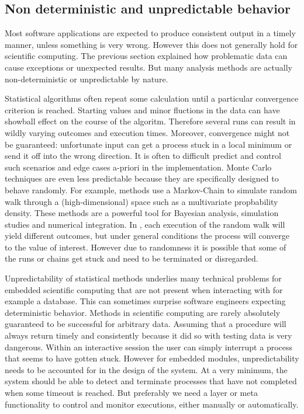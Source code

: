 \subsection{Non deterministic and unpredictable behavior}

Most software applications are expected to produce consistent output in a timely manner, unless something is very wrong. However this does not generally hold for scientific computing. The previous section explained how problematic data can cause exceptions or unexpected results. But many analysis methods are actually non-deterministic or unpredictable by nature.

Statistical algorithms often repeat some calculation until a particular convergence criterion is reached. Starting values and minor fluctions in the data can have showball effect on the course of the algoritm. Therefore several runs can result in wildly varying outcomes and execution times. Moreover, convergence might not be guaranteed: unfortunate input can get a process stuck in a local minimum or send it off into the wrong direction. It is often to difficult predict and control such scenarios and edge cases a-priori in the implementation. Monte Carlo techniques are even less predictable because they are specifically designed to behave randomly. For example, \MCMC methods use a Markov-Chain to simulate random walk through a (high-dimensional) space such as a multivariate propbability density. These methods are a powerful tool for Bayesian analysis, simulation studies and numerical integration. In \MCMC, each execution of the random walk will yield different outcomes, but under general conditions the process will converge to the value of interest. However due to randomness it is possible that some of the runs or chains get stuck and need to be terminated or disregarded.

Unpredictability of statistical methods underlies many technical problems for embedded scientific computing that are not present when interacting with for example a database. This can sometimes surprise software engineers expecting deterministic behavior. Methods in scientific computing are rarely absolutely guaranteed to be successful for arbitrary data. Assuming that a procedure will always return timely and consistently because it did so with testing data is very dangerous. Within an interactive session the user can simply interrupt a process that seems to have gotten stuck. However for embedded modules, unpredictability needs to be accounted for in the design of the system. At a very minimum, the system should be able to detect and terminate processes that have not completed when some timeout is reached. But preferably we need a layer or meta functionality to control and monitor executions, either manually or automatically. 

